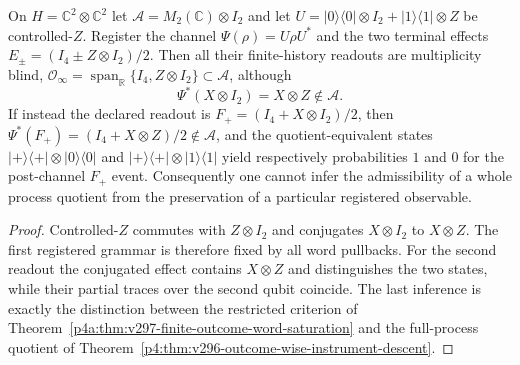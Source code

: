 \documentclass[12pt,a4paper]{article}
\begin{document}
\begin{proposition}
\label{p4a:prop:v297-specific-versus-full-process}
On $H=\mathbb C^2\otimes\mathbb C^2$ let
$\mathcal A=M_2(\mathbb C)\otimes I_2$ and let
$U=|0\rangle\langle0|\otimes I_2+
|1\rangle\langle1|\otimes Z$ be controlled-$Z$.
Register the channel $\Psi(\rho)=U\rho U^*$ and the two terminal effects
$E_\pm=(I_4\pm Z\otimes I_2)/2$. Then all their finite-history
readouts are multiplicity blind,
$\mathcal O_\infty=\operatorname{span}_{\mathbb R}
\{I_4,Z\otimes I_2\}\subset\mathcal A$, although
\[
 \Psi^*(X\otimes I_2)=X\otimes Z\notin\mathcal A.
\]
If instead the declared readout is
$F_+=(I_4+X\otimes I_2)/2$, then
$\Psi^*(F_+)=(I_4+X\otimes Z)/2\notin\mathcal A$, and the
quotient-equivalent states
$|+\rangle\langle+|\otimes|0\rangle\langle0|$ and
$|+\rangle\langle+|\otimes|1\rangle\langle1|$ yield respectively
probabilities $1$ and $0$ for the post-channel $F_+$ event.
Consequently one cannot infer the admissibility of a whole process
quotient from the preservation of a particular registered observable.
\end{proposition}
\begin{proof}
Controlled-$Z$ commutes with $Z\otimes I_2$ and conjugates
$X\otimes I_2$ to $X\otimes Z$. The first registered grammar is
therefore fixed by all word pullbacks. For the second readout the
conjugated effect contains $X\otimes Z$ and distinguishes the two
states, while their partial traces over the second qubit coincide.
The last inference is exactly the distinction between the restricted
criterion of Theorem~\ref{p4a:thm:v297-finite-outcome-word-saturation}
and the full-process quotient of
Theorem~\ref{p4:thm:v296-outcome-wise-instrument-descent}.
\end{proof}
\end{document}
